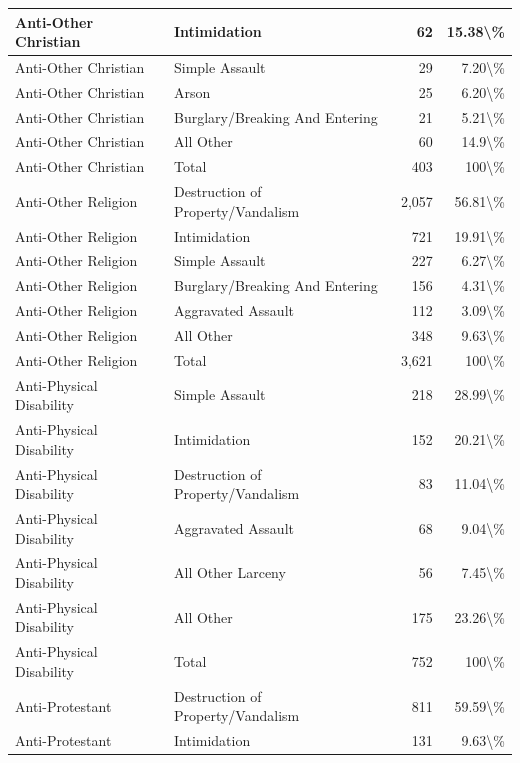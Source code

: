 \documentclass[
]{krantz}
\begin{document}
\begin{longtable}[t]{l|l|r|r}
\hline
Anti-Other Christian & Intimidation & 62 & 15.38\textbackslash{}\%\\
\hline
Anti-Other Christian & Simple Assault & 29 & 7.20\textbackslash{}\%\\
\hline
Anti-Other Christian & Arson & 25 & 6.20\textbackslash{}\%\\
\hline
Anti-Other Christian & Burglary/Breaking And Entering & 21 & 5.21\textbackslash{}\%\\
\hline
Anti-Other Christian & All Other & 60 & 14.9\textbackslash{}\%\\
\hline
Anti-Other Christian & Total & 403 & 100\textbackslash{}\%\\
\hline
Anti-Other Religion & Destruction of Property/Vandalism & 2,057 & 56.81\textbackslash{}\%\\
\hline
Anti-Other Religion & Intimidation & 721 & 19.91\textbackslash{}\%\\
\hline
Anti-Other Religion & Simple Assault & 227 & 6.27\textbackslash{}\%\\
\hline
Anti-Other Religion & Burglary/Breaking And Entering & 156 & 4.31\textbackslash{}\%\\
\hline
Anti-Other Religion & Aggravated Assault & 112 & 3.09\textbackslash{}\%\\
\hline
Anti-Other Religion & All Other & 348 & 9.63\textbackslash{}\%\\
\hline
Anti-Other Religion & Total & 3,621 & 100\textbackslash{}\%\\
\hline
Anti-Physical Disability & Simple Assault & 218 & 28.99\textbackslash{}\%\\
\hline
Anti-Physical Disability & Intimidation & 152 & 20.21\textbackslash{}\%\\
\hline
Anti-Physical Disability & Destruction of Property/Vandalism & 83 & 11.04\textbackslash{}\%\\
\hline
Anti-Physical Disability & Aggravated Assault & 68 & 9.04\textbackslash{}\%\\
\hline
Anti-Physical Disability & All Other Larceny & 56 & 7.45\textbackslash{}\%\\
\hline
Anti-Physical Disability & All Other & 175 & 23.26\textbackslash{}\%\\
\hline
Anti-Physical Disability & Total & 752 & 100\textbackslash{}\%\\
\hline
Anti-Protestant & Destruction of Property/Vandalism & 811 & 59.59\textbackslash{}\%\\
\hline
Anti-Protestant & Intimidation & 131 & 9.63\textbackslash{}\%\\

\end{longtable}
\end{document}
